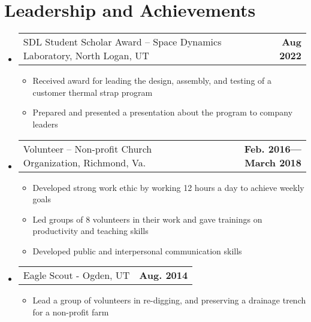 \documentclass[letterpaper,11pt]{article}
\makeatletter
\newcommand{\resumeProjectHeading}[2]{
    \vspace{-6pt}
    \item
    \begin{tabular*}{1.0\textwidth}{l@{\extracolsep{\fill}}r}
      \small#1 & \textbf{\small #2}\\
    \end{tabular*}\vspace{-11pt}
}
\newcommand{\resumeSubHeadingListStart}{\begin{itemize}[leftmargin=0.0in, label={}]}
\newcommand{\resumeSubHeadingListEnd}{\end{itemize}}
\newcommand{\resumeItemListStart}{\begin{itemize}}
\newcommand{\resumeItemListEnd}{\end{itemize}\vspace{-5pt}}
\newcommand{\resumeItem}[1]{ 
  \item\small{
    {#1 \vspace{-5pt}}
  }
}
\makeatother
\begin{document}
\vspace{-8pt}

\section{Leadership and Achievements }
    \resumeSubHeadingListStart
    \resumeProjectHeading
      {SDL Student Scholar Award – Space Dynamics Laboratory, North Logan, UT	}{Aug 2022}
      \resumeItemListStart
        \resumeItem{Received award for leading the design, assembly, and testing of a customer thermal strap program}
        \resumeItem{Prepared and presented a presentation about the program to company leaders}
      \resumeItemListEnd
    \resumeProjectHeading
      {Volunteer – Non-profit Church Organization, Richmond, Va.}{Feb. 2016—March 2018}
      \resumeItemListStart
        \resumeItem{Developed strong work ethic by working 12 hours a day to achieve weekly goals}
        \resumeItem{Led groups of 8 volunteers in their work and gave trainings on productivity and teaching skills}
        \resumeItem{Developed public and interpersonal communication skills}
      \resumeItemListEnd
    \resumeProjectHeading
      {Eagle Scout - Ogden, UT}{Aug. 2014}
      \resumeItemListStart
        \resumeItem{Lead a group of volunteers in re-digging, and preserving a drainage trench for a non-profit farm}
      \resumeItemListEnd

    \resumeSubHeadingListEnd
\vspace{-16pt}
\end{document}
